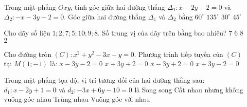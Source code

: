 \begin{ex}%
	Trong mặt phẳng $Oxy$, tính góc giữa hai đường thẳng $\Delta_1\colon x-2 y-2=0$ và $\Delta_2\colon -x-3 y-2=0$. Góc giữa hai đường thẳng $\Delta_1$ và $\Delta_2$ bằng
	\choice
	{$60^{\circ}$}
	{$135^{\circ}$}
	{$30^{\circ}$}
	{$45^{\circ}$}
\end{ex}

\begin{ex}%
	Cho dãy số liệu $1 ; 2 ; 7 ; 5 ; 10 ; 9 ; 8$. Số trung vị của dãy trên bằng bao nhiêu?
	\choice
	{$ 7  $}
	{\True $ 6  $}
	{$ 8  $}
	{$ 2 $ }
\end{ex}

\begin{ex}%
	Cho đường tròn $(C)\colon  x^2+y^2-3 x-y=0$. Phương trình tiếp tuyến của $(C)$ tại $M(1 ;-1)$ là:
	\choice
	{$x-3 y-2=0$}
	{\True $x+3 y+2=0$}
	{$x-3 y+2=0$}
	{$x+3 y-2=0$}
\end{ex}

\begin{ex}%
	Trong mặt phẳng tọa độ, vị trí tương đối của hai đường thẳng sau: $d_1: x-2 y+1=0$ và $d_2:-3 x+6 y-10=0$ là
	\choice
	{Song song}
	{Cắt nhau nhưng không vuông góc nhau}
	{Trùng nhau}
	{Vuông góc với nhau}
\end{ex}

